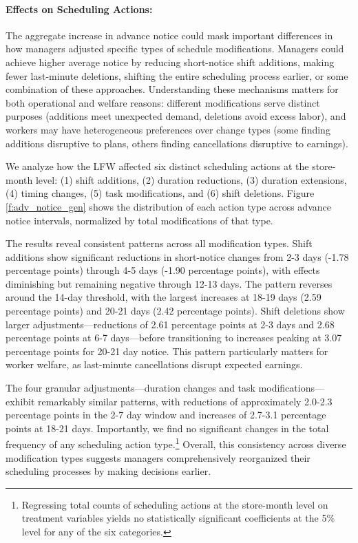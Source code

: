 \documentclass[letterpaper,11pt,leqno]{article}
\theoremstyle{paper}
\begin{document}
\paragraph{Effects on Scheduling Actions:}

The aggregate increase in advance notice could mask important differences in how managers adjusted specific types of schedule modifications. Managers could achieve higher average notice by reducing short-notice shift additions, making fewer last-minute deletions, shifting the entire scheduling process earlier, or some combination of these approaches. Understanding these mechanisms matters for both operational and welfare reasons: different modifications serve distinct purposes (additions meet unexpected demand, deletions avoid excess labor), and workers may have heterogeneous preferences over change types (some finding additions disruptive to plans, others finding cancellations disruptive to earnings).

We analyze how the LFW affected six distinct scheduling actions at the store-month level: (1) shift additions, (2) duration reductions, (3) duration extensions, (4) timing changes, (5) task modifications, and (6) shift deletions. Figure \ref{f:adv_notice_gen} shows the distribution of each action type across advance notice intervals, normalized by total modifications of that type.

The results reveal consistent patterns across all modification types. Shift additions show significant reductions in short-notice changes from 2-3 days (-1.78 percentage points) through 4-5 days (-1.90 percentage points), with effects diminishing but remaining negative through 12-13 days. The pattern reverses around the 14-day threshold, with the largest increases at 18-19 days (2.59 percentage points) and 20-21 days (2.42 percentage points). Shift deletions show larger adjustments—reductions of 2.61 percentage points at 2-3 days and 2.68 percentage points at 6-7 days—before transitioning to increases peaking at 3.07 percentage points for 20-21 day notice. This pattern particularly matters for worker welfare, as last-minute cancellations disrupt expected earnings.

The four granular adjustments—duration changes and task modifications—exhibit remarkably similar patterns, with reductions of approximately 2.0-2.3 percentage points in the 2-7 day window and increases of 2.7-3.1 percentage points at 18-21 days. Importantly, we find no significant changes in the total frequency of any scheduling action type.\footnote{Regressing total counts of scheduling actions at the store-month level on treatment variables yields no statistically significant coefficients at the 5\% level for any of the six categories.} Overall, this consistency across diverse modification types suggests managers comprehensively reorganized their scheduling processes by making decisions earlier. 
\end{document}
